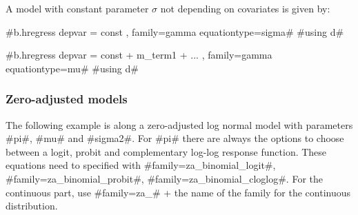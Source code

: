 A model with constant parameter $\sigma$ not depending on covariates is given by:

#b.hregress depvar = const  , family=gamma equationtype=sigma#
#using d#

#b.hregress depvar = const + m_term1 + ... , family=gamma equationtype=mu#
#using d#



%
%
%
%
%
%
%
%
%
%
%
%
%
%
%
%
%
%
%

\subsubsection*{Zero-adjusted models}

The following example is along a zero-adjusted log normal model with parameters #pi#, #mu# and #sigma2#.
For #pi# there are always the options to choose between a logit, probit and complementary log-log response function.
These equations need to specified with #family=za_binomial_logit#, #family=za_binomial\_probit#, #family=za_binomial_cloglog#.
For the continuous part, use #family=za_# + the name of the family for the continuous distribution.


